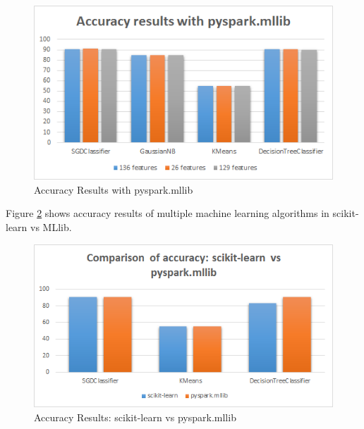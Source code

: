\documentclass[9pt,twocolumn,twoside]{../../styles/osajnl}
\begin{document}
\begin{figure}[h]
\centering
\includegraphics[width=\linewidth,scale=1]{images/accmllib}
\caption{Accuracy Results with pyspark.mllib}
\label{fig:accmllib}
\end{figure}

Figure \ref{fig:mllibvssklearn} shows accuracy results of multiple machine learning algorithms in scikit-learn vs MLlib.

\begin{figure}[h]
\centering
\includegraphics[width=\linewidth,scale=1]{images/mllibvssklearn}
\caption{Accuracy Results: scikit-learn vs pyspark.mllib}
\label{fig:mllibvssklearn}
\end{figure}
\end{document}
